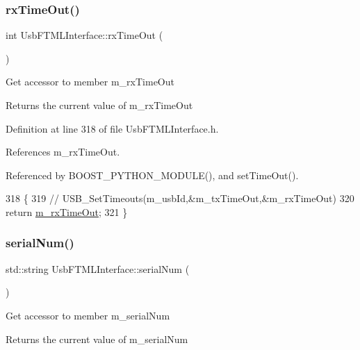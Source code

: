 \subsubsection{\texorpdfstring{rx\+Time\+Out()}{rxTimeOut()}}
{\footnotesize\ttfamily int Usb\+F\+T\+M\+L\+Interface\+::rx\+Time\+Out (\begin{DoxyParamCaption}{ }\end{DoxyParamCaption})\hspace{0.3cm}{\ttfamily [inline]}}

Get accessor to member m\+\_\+rx\+Time\+Out \begin{DoxyReturn}{Returns}
the current value of m\+\_\+rx\+Time\+Out 
\end{DoxyReturn}


Definition at line 318 of file Usb\+F\+T\+M\+L\+Interface.\+h.



References m\+\_\+rx\+Time\+Out.



Referenced by B\+O\+O\+S\+T\+\_\+\+P\+Y\+T\+H\+O\+N\+\_\+\+M\+O\+D\+U\+L\+E(), and set\+Time\+Out().


\begin{DoxyCode}
318                    \{
319     \textcolor{comment}{//    USB\_SetTimeouts(m\_usbId,&m\_txTimeOut,&m\_rxTimeOut)}
320     \textcolor{keywordflow}{return} \hyperlink{classUsbFTMLInterface_a4e3a413912cb5f61b5885c0d22e6c179}{m\_rxTimeOut};
321   \}
\end{DoxyCode}
\mbox{\label{classUsbFTMLInterface_a6b005503472f0ff0357662555275cba4}} 
\subsubsection{\texorpdfstring{serial\+Num()}{serialNum()}}
{\footnotesize\ttfamily std\+::string Usb\+F\+T\+M\+L\+Interface\+::serial\+Num (\begin{DoxyParamCaption}{ }\end{DoxyParamCaption})\hspace{0.3cm}{\ttfamily [inline]}}

Get accessor to member m\+\_\+serial\+Num \begin{DoxyReturn}{Returns}
the current value of m\+\_\+serial\+Num 
\end{DoxyReturn}


